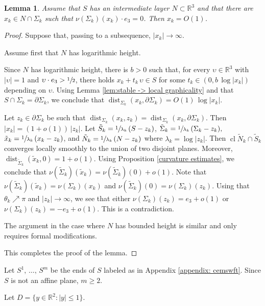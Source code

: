 \documentclass[11pt]{amsart}
\newtheorem{lem}[prop]{Lemma}
\begin{document}
\begin{lem} \label{sandwich}
	Assume that $S$ has an intermediate layer $N\subset \mathbb{R}^3$ and that there are $x_k\in N\cap\Sigma_k$ such that $\nu(\Sigma_k)(x_k)\cdot e_3=0$. Then $x_k=O(1)$.
\end{lem} 
\begin{proof}
Suppose that, passing to a subsequence, $|x_k|\to \infty$.

Assume first that $N$ has logarithmic height.
	
	 Since $N$ has logarithmic height, there is   $b>0$ such that, for every $\upsilon\in \mathbb{R}^3$ with $|\upsilon|=1$ and $\upsilon\cdot e_3>\sfrac12$, there holds  $x_k+t_k\,\upsilon\in S$ for some $t_k\in (0,b\,\log |x_k|)$ depending on $\upsilon$. 	
	 Using Lemma \ref{lem:stable -> local graphicality} and that $S\cap \Sigma_k=\partial \Sigma_k$, we conclude that $\operatorname{dist}_{\Sigma_k}(x_k,\partial \Sigma_k)=O(1)\,\log |x_k|$.
	 
	  Let $z_k\in \partial \Sigma_k$ be such that $\operatorname{dist}_{\Sigma_k}(x_k,z_k)=\operatorname{dist}_{\Sigma_k}(x_k,\partial \Sigma_k)$. Then
	 $
	|x_k|=(1+o(1))\,|z_k|.
	 $ 
	 Let  $\tilde S_k=\sfrac1{\lambda_k}\,(S-z_k)$, $\tilde \Sigma_k=\sfrac{1}{\lambda_k}\,(\Sigma_k-z_k),$ $\tilde x_k=\sfrac1{\lambda_k}\,(x_k-z_k)$, and $\tilde N_k=\sfrac1{\lambda_k}\,( N-z_k)$ where $\lambda_k=\log|z_k|$. Then $ \operatorname{cl} \tilde N_k\cap \tilde S_k$ converges locally smoothly to the union of two disjoint planes. Moreover,  $\operatorname{dist}_{\tilde \Sigma_k}(\tilde x_k,0)=1+o(1)$. Using Proposition \ref{curvature estimates}, we conclude that $\nu(\tilde \Sigma_k)(\tilde x_k)=\nu(\tilde \Sigma_k)(0)+o(1)$. Note that $\nu(\tilde \Sigma_k)(\tilde x_k)=\nu(\Sigma_k)(x_k)$ and $\nu(\tilde \Sigma_k)(0)=\nu(\Sigma_k)(z_k)$. Using that $\theta_k\nearrow \pi$ and $|z_k|\to \infty$, we see that  either $\nu(\Sigma_k)(z_k)=e_3+o(1)$ or $\nu(\Sigma_k)(z_k)=-e_3+o(1)$. This is a contradiction.
	 
The argument in the case where  $N$ has bounded height is similar and only requires formal modifications. 	 
	 
	 This completes the proof of the lemma.
\end{proof}


Let $S^1,\,\ldots,\, S^m$ be the ends of $S$ labeled as in Appendix \ref{appendix: cemswft}. Since $S$ is not an affine plane, $m\geq 2$.

Let $D=\{y\in \mathbb{R}^2:|y|\leq 1\}$.
\end{document}
